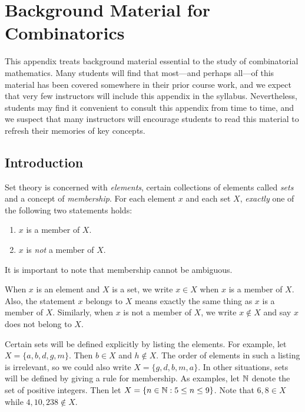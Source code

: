 
\chapter{Background Material for Combinatorics}\label{app:background}

This appendix treats background material essential to the
study of combinatorial mathematics.  Many students will find that
most---and perhaps all---of this material has been covered somewhere
in their prior course work, and we expect that very few instructors
will include this appendix in the syllabus.  Nevertheless, students
may find it convenient to consult this appendix from time to
time, and we suspect that many instructors will encourage
students to read this material to refresh their memories of key
concepts.  

\section{Introduction}\label{s:background:intro}

Set theory is concerned with \textit{elements}, certain collections
of elements called \textit{sets} and a concept of \textit{membership}.
For each element $x$ and each set $X$, \textit{exactly} one of the 
following two statements holds:

\begin{enumerate}
\item $x$ is a member of $X$. 
\item $x$ is \textit{not} a member of $X$. 
\end{enumerate}

It is important to note that membership cannot be ambiguous.

When $x$ is an element and $X$ is a set, we write $x\in X$ when
$x$ is a member of $X$.  Also, the statement $x$ belongs to $X$ means
exactly the same thing as $x$ is a member of $X$.  Similarly, when
$x$ is not a member of $X$, we write $x\notin X$ and say $x$ does
not belong to $X$.

Certain sets will be defined explicitly by listing the elements.
For example, let $X=\{a,b,d,g,m\}$.  Then $b\in X$ and $h\notin X$.
The order of elements in such a listing is irrelevant, so we could
also write $X=\{g,d,b,m,a\}$.  In other situations, sets will be 
defined by giving a rule for membership.
As examples, let $\mathbb{N}$ denote the set of positive integers.  
Then let $X=\{n\in\mathbb{N}:5\le n\le 9\}$.   Note that $6,8\in X$ while
$4,10,238\notin X$.

